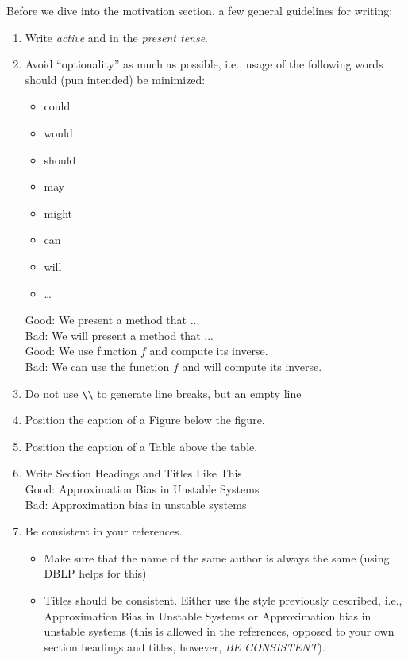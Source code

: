 Before we dive into the motivation section, a few general guidelines for writing:
\begin{enumerate}
	\item Write \emph{active} and in the \emph{present tense}.
	\item Avoid \enquote{optionality} as much as possible, i.e., usage of the following words should (pun intended) be minimized:
	      \begin{itemize}
		      \item could
		      \item would
		      \item should
		      \item may
		      \item might
		      \item can
		      \item will
		      \item \dots
	      \end{itemize}
	      Good: We present a method that ...\\
	      Bad: We will present a method that ...\\
	      Good: We use function $f$ and compute its inverse.\\
	      Bad: We can use the function $f$ and will compute its inverse.
	\item Do not use \verb|\\| to generate line breaks, but an empty line %
	\item Position the caption of a Figure below the figure.
	\item Position the caption of a Table above the table.
	\item Write Section Headings and Titles Like This\\
	      Good: Approximation Bias in Unstable Systems\\
	      Bad: Approximation bias in unstable systems
	\item Be consistent in your references.
	      \begin{itemize}
		      \item Make sure that the name of the same author is always the same (using DBLP helps for this)
		      \item Titles should be consistent. Either use the style previously described, i.e., Approximation Bias in Unstable Systems or Approximation bias in unstable systems (this is allowed in the references, opposed to your own section headings and titles, however, \emph{BE CONSISTENT}).
	      \end{itemize}
\end{enumerate}

